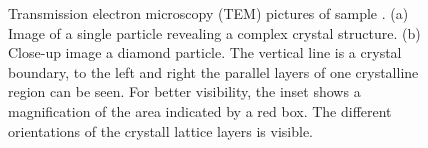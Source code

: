 \begin{figure}[htp]
\begin{subfigure}[t]{ 0.49\linewidth}


					\end{subfigure}
					\caption[\TEM imaging of a single \nd]{Transmission electron microscopy (TEM) pictures of sample \insituH. (a) Image of a single \nd particle revealing a complex crystal structure. (b) Close-up image a diamond particle. The vertical line is a crystal boundary, to the left and right the parallel layers of one crystalline region can be seen. For better visibility, the inset shows a magnification of the area indicated by a red box. The different orientations of the crystall lattice layers is visible.}
					\label{fig::tem}
				\end{figure}
